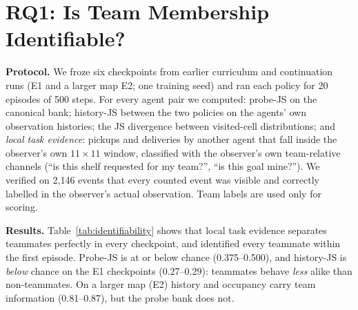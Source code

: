 \documentclass{article}
\begin{document}
\section{RQ1: Is Team Membership Identifiable?}
\label{sec:rq1}
\textbf{Protocol.} We froze six checkpoints from earlier curriculum and continuation runs (E1 and a larger map E2;
one training seed) and ran each policy for 20 episodes of 500 steps. For every agent pair we computed:
probe-JS on the canonical bank; history-JS between the two policies on the agents' own observation histories;
the JS divergence between visited-cell distributions; and \emph{local task evidence}: pickups and deliveries by
another agent that fall inside the observer's own $11\times11$ window, classified with the observer's own
team-relative channels (``is this shelf requested for my team?'', ``is this goal mine?''). We verified on 2{,}146
events that every counted event was visible and correctly labelled in the observer's actual observation.
Team labels are used only for scoring.

\begin{table}[t]
\centering
\small
{}
\caption{Same-team AUROC of pairwise scores (1 = teammates always score higher; 0.5 = chance). Frozen
checkpoints of one training seed, 20$\times$500 steps each.}
\label{tab:identifiability}
\end{table}

\textbf{Results.} Table~\ref{tab:identifiability} shows that local task evidence separates teammates perfectly
in every checkpoint, and identified every teammate within the first episode. Probe-JS is at or below chance
(0.375--0.500), and history-JS is \emph{below} chance on the E1 checkpoints (0.27--0.29): teammates behave
\emph{less} alike than non-teammates. On a larger map (E2) history and occupancy carry team information
(0.81--0.87), but the probe bank does not.
\end{document}
